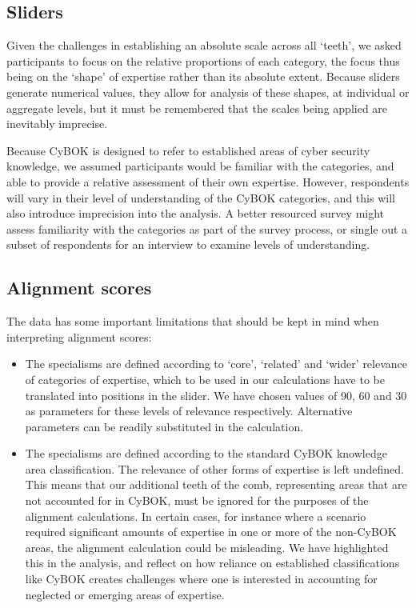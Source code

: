\documentclass[
  a4paper,
]{book}
\begin{document}
\subsection{Sliders}\label{sliders}

Given the challenges in establishing an absolute scale across all
`teeth', we asked participants to focus on the relative proportions of
each category, the focus thus being on the `shape' of expertise rather
than its absolute extent. Because sliders generate numerical values,
they allow for analysis of these shapes, at individual or aggregate
levels, but it must be remembered that the scales being applied are
inevitably imprecise.

Because CyBOK is designed to refer to established areas of cyber
security knowledge, we assumed participants would be familiar with the
categories, and able to provide a relative assessment of their own
expertise. However, respondents will vary in their level of
understanding of the CyBOK categories, and this will also introduce
imprecision into the analysis. A better resourced survey might assess
familiarity with the categories as part of the survey process, or single
out a subset of respondents for an interview to examine levels of
understanding.

\subsection{Alignment scores}\label{alignment-scores}

The data has some important limitations that should be kept in mind when
interpreting alignment scores:

\begin{itemize}
\item
  The specialisms are defined according to `core', `related' and `wider'
  relevance of categories of expertise, which to be used in our
  calculations have to be translated into positions in the slider. We
  have chosen values of 90, 60 and 30 as parameters for these levels of
  relevance respectively. Alternative parameters can be readily
  substituted in the calculation.
\item
  The specialisms are defined according to the standard CyBOK knowledge
  area classification. The relevance of other forms of expertise is left
  undefined. This means that our additional teeth of the comb,
  representing areas that are not accounted for in CyBOK, must be
  ignored for the purposes of the alignment calculations. In certain
  cases, for instance where a scenario required significant amounts of
  expertise in one or more of the non-CyBOK areas, the alignment
  calculation could be misleading. We have highlighted this in the
  analysis, and reflect on how reliance on established classifications
  like CyBOK creates challenges where one is interested in accounting
  for neglected or emerging areas of expertise.
\end{itemize}
\end{document}
